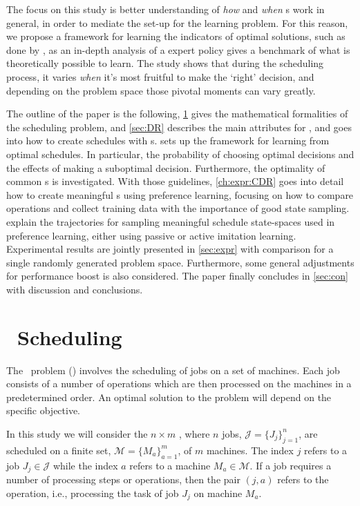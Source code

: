 \documentclass[smallextended]{svjour3}
\begin{document}
The focus on this study is better understanding of \emph{how} and \emph{when} 
\dr s work in general, in order to mediate the set-up for the 
learning problem.
For this reason, we propose a framework for learning the indicators of optimal 
solutions, such as done by \cite{Siggi10}, as an in-depth analysis of a expert 
policy gives a benchmark of what is theoretically possible to learn. 
The study shows that during the scheduling process, it varies \emph{when} it's 
most fruitful to make the `right' decision, and depending on the problem space 
those pivotal moments can vary greatly. 

The outline of the paper is the following, \cref{sec:problemdef} gives the 
mathematical formalities of the scheduling problem, and  
\cref{sec:DR} describes the main attributes for \jsp, 
and goes into how to create schedules with \dr s. 
 sets up the framework for learning from optimal schedules. 
In particular, the probability of choosing optimal decisions and the effects of 
making a suboptimal decision. Furthermore, the optimality of common \sdr s is 
investigated.
With those guidelines, \cref{ch:expr:CDR} goes into detail how to create 
meaningful \cdr s using preference learning, focusing on how to 
compare operations and collect training data with the importance of good state 
sampling. 
 explain the trajectories for 
sampling meaningful schedule state-spaces used in preference learning, either 
using passive or active imitation learning. 
Experimental results are jointly presented in \cref{sec:expr} with comparison 
for a single randomly generated problem space. Furthermore, some general 
adjustments for performance boost is also considered.
The paper finally concludes in \cref{sec:con} with discussion and conclusions.


\section{\Jsp~Scheduling}\label{sec:problemdef}
The \jsp~problem (\JSP) involves the scheduling of jobs on a set of 
machines. Each job consists of a number of operations which are then processed 
on the machines in a predetermined order. An optimal solution to the problem 
will depend on the specific objective. 

In this study we will consider the $n\times m$ \JSP, where $n$ jobs, 
$\mathcal{J}=\{J_j\}_{j=1}^n$, are scheduled on a finite set, 
$\mathcal{M}=\{M_a\}_{a=1}^m$, of $m$ machines. The index $j$ refers to a job 
$J_j\in\mathcal{J}$ while the index  $a$ refers to a machine 
$M_a\in\mathcal{M}$. 
If a job requires a number of processing steps or operations, then the pair 
$(j,a)$ refers to the operation, i.e., processing the task of job $J_j$ on 
machine $M_a$. 
\end{document}
